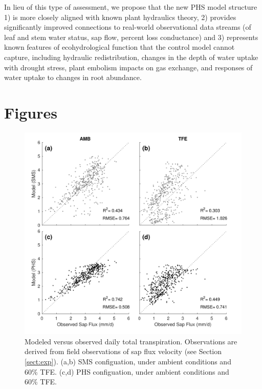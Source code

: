 \documentclass[draft,linenumbers]{agujournal}
\begin{document}
    In lieu of this type of assessment, we propose that the new PHS model structure 1) is more closely aligned with known plant hydraulics theory, 2) provides significantly improved connections to real-world observational data streams (of leaf and stem water status, sap flow, percent loss conductance) and 3) represents known features of ecohydrological function that the control model cannot capture, including hydraulic redistribution, changes in the depth of water uptake with drought stress, plant embolism impacts on gas exchange, and responses of water uptake to changes in root abundance. 
      
      
\section{Figures}

  \begin{figure}[h]
     \centering
     \includegraphics[width=30pc]{T.pdf}
     \caption{Modeled versus observed daily total transpiration. Observations are derived from field observations of sap flux velocity (see Section \ref{sect:exp}).
     (a,b) SMS configuation, under ambient conditions and 60\% TFE.
     (c,d) PHS configuation, under ambient conditions and 60\% TFE.
     }
     \label{fig:t}
  \end{figure}
  
\end{document}
